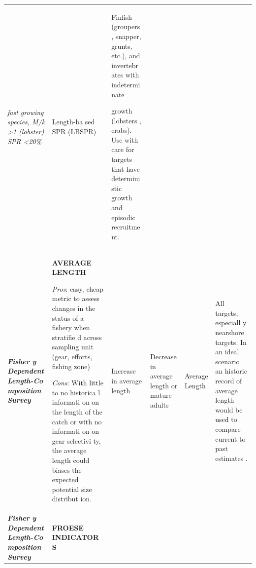 \documentclass[]{book}
\begin{document}
\begin{longtable}[]{@{}llllll@{}}
\begin{minipage}[t]{0.16\columnwidth}
\emph{fast growing species, M/k \textgreater{}1 (lobster) SPR
\textless{}20\%}\strut
\end{minipage} & \begin{minipage}[t]{0.16\columnwidth}\raggedright\strut
Length-ba sed SPR (LBSPR)\strut
\end{minipage} & \begin{minipage}[t]{0.16\columnwidth}\raggedright\strut
Finfish (groupers , snapper, grunts, etc.), and invertebr ates with
indetermi nate

growth (lobsters , crabs). Use with care for targets that have determini
stic growth and episodic recruitme nt.\strut
\end{minipage}\tabularnewline
\begin{minipage}[t]{0.16\columnwidth}\raggedright\strut
\textbf{\emph{Fisher y Dependent Length-Co mposition Survey}}\strut
\end{minipage} & \begin{minipage}[t]{0.16\columnwidth}\raggedright\strut
\textbf{AVERAGE LENGTH}

\emph{Pros}: easy, cheap metric to assess changes in the status of a
fishery when stratifie d across sampling unit (gear, efforts, fishing
zone)

\emph{Cons}: With little to no historica l informati on on the length of
the catch or with no informati on on gear selectivi ty, the average
length could biases the expected potential size distribut ion.\strut
\end{minipage} & \begin{minipage}[t]{0.16\columnwidth}\raggedright\strut
Increase in average length\strut
\end{minipage} & \begin{minipage}[t]{0.16\columnwidth}\raggedright\strut
Decrease in average length or mature adults\strut
\end{minipage} & \begin{minipage}[t]{0.16\columnwidth}\raggedright\strut
Average Length\strut
\end{minipage} & \begin{minipage}[t]{0.16\columnwidth}\raggedright\strut
All targets, especiall y nearshore targets. In an ideal scenario an
historic record of average length would be used to compare current to
past estimates .\strut
\end{minipage}\tabularnewline
\begin{minipage}[t]{0.16\columnwidth}\raggedright\strut
\textbf{\emph{Fisher y Dependent Length-Co mposition Survey}}\strut
\end{minipage} & \begin{minipage}[t]{0.16\columnwidth}\raggedright\strut
\textbf{FROESE INDICATOR S}


\end{minipage}
\end{longtable}
\end{document}
